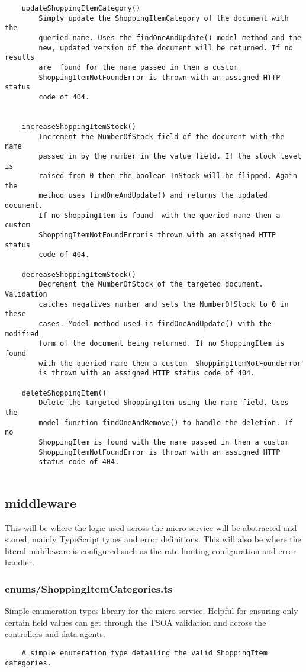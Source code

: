 \begin{verbatim}
    updateShoppingItemCategory()
        Simply update the ShoppingItemCategory of the document with the
        queried name. Uses the findOneAndUpdate() model method and the
        new, updated version of the document will be returned. If no results 
        are  found for the name passed in then a custom 
        ShoppingItemNotFoundError is thrown with an assigned HTTP status 
        code of 404.
    
    
    increaseShoppingItemStock()
        Increment the NumberOfStock field of the document with the name
        passed in by the number in the value field. If the stock level is
        raised from 0 then the boolean InStock will be flipped. Again the
        method uses findOneAndUpdate() and returns the updated document.
        If no ShoppingItem is found  with the queried name then a custom  
        ShoppingItemNotFoundErroris thrown with an assigned HTTP status 
        code of 404.
        
    decreaseShoppingItemStock()
        Decrement the NumberOfStock of the targeted document. Validation
        catches negatives number and sets the NumberOfStock to 0 in these
        cases. Model method used is findOneAndUpdate() with the modified 
        form of the document being returned. If no ShoppingItem is found 
        with the queried name then a custom  ShoppingItemNotFoundError 
        is thrown with an assigned HTTP status code of 404.
    
    deleteShoppingItem()
        Delete the targeted ShoppingItem using the name field. Uses the
        model function findOneAndRemove() to handle the deletion. If no 
        ShoppingItem is found with the name passed in then a custom 
        ShoppingItemNotFoundError is thrown with an assigned HTTP 
        status code of 404.
        
\end{verbatim}
\subsection{middleware}
This will be where the logic used across the micro-service will be abstracted and stored, mainly TypeScript types and error definitions. This will also be where the literal middleware is configured such as the rate limiting configuration and error handler.
\subsubsection{enums/ShoppingItemCategories.ts}
Simple enumeration types library for the micro-service. Helpful for ensuring only certain field values can get through the TSOA validation and across the controllers and data-agents.
\begin{verbatim}
    A simple enumeration type detailing the valid ShoppingItem categories.
\end{verbatim}
